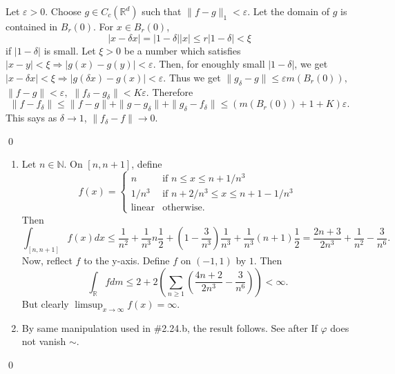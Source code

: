 \begin{exercise}[2.2] \hfill

	Let $\varepsilon > 0$.
	Choose $g \in C_c(\mathbb{R}^d)$ such that $\| f-g\|_1 < \varepsilon.$
	Let the domain of $g$ is contained in $B_r(0)$.
	For $x\in B_r(0)$,
	\[
		|x - \delta x| = |1-\delta||x| \le r |1-\delta| < \xi
	\]
	if $|1-\delta|$ is small.
	Let $\xi>0$ be a number which satisfies $|x- y|<\xi \Rightarrow |g(x) - g(y) | < \varepsilon$.
	Then, for enoughly small $|1-\delta|$, we get $|x-\delta x| < \xi \Rightarrow |g(\delta x) - g(x)|<\varepsilon$.
	Thus we get $\| g_\delta - g \| \le \varepsilon m(B_r(0)),$ $\| f-g\| < \varepsilon,$ $\| f_\delta - g_\delta \| < K\varepsilon.$
	Therefore
	\[
		\| f-f_\delta \| \leq \|f-g\| + \|g-g_\delta \| + \|g_\delta - f_\delta\|
		\le \left( m(B_r(0)) + 1 + K \right)\varepsilon.
	\]
	This says as $\delta \rightarrow 1$, $\| f_\delta - f\| \rightarrow 0$.

	\qed
\end{exercise}

\begin{exercise}[2.6] \hfill

	\begin{enumerate}[label = (\alph*)]
		\item Let $n\in \mathbb{N}$.
		On $\left[ n, n+1 \right]$, define
		\[
			f(x) = 
			\begin{cases}
				n &\text{if } n\le x \le n+ 1/n^3\\
				1/n^3 &\text{if } n+2/n^3 \le x \le n+1-1/n^3 \\
				\text{linear} &\text{otherwise.}
			\end{cases}
		\]
		Then
		\[
			\int_{\left[ n, n+1 \right]} f(x)dx \le \frac{1}{n^2} +\frac{1}{n^3}n\frac{1}{2}
			+\left( 1-\frac{3}{n^3} \right)\frac{1}{n^3}
			+\frac{1}{n^3}(n+1)\frac{1}{2}
			=\frac{2n+3}{2n^3}+\frac{1}{n^2}-\frac{3}{n^6}.
		\]
		Now, reflect $f$ to the y-axis.
		Define $f$ on $(-1, 1)$ by $1$.
		Then
		\[
			\int_\mathbb{R} f dm \le 2+ 2\left( \sum_{n\ge 1}\left( \frac{4n+2}{2n^3} - \frac{3}{n^6} \right) \right) <\infty.
		\]
		But clearly $\limsup_{x\rightarrow \infty} f(x) = \infty$.

		\item By same manipulation used in \#2.24.b, the result follows.
			See after If $\varphi$ does not vanish $\sim$.
	\end{enumerate}

\qed
\end{exercise}

